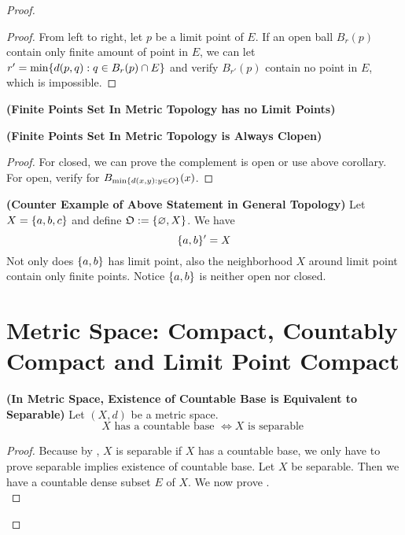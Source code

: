 \documentclass{report}
\begin{document}
\begin{proof}
\begin{proof}
  From left to right, let $p$ be a limit point of  $E$. If an open ball $B_r(p)$ contain only finite amount of point in $E$, we can let $r'=\min \{ d(p,q):q\in B_r(p)\cap E \}$ and verify  $B_{r'}(p)$ contain no point in $E$, which is impossible. 
\end{proof}
\begin{corollary}
\label{1.9.7}
\textbf{(Finite Points Set In Metric Topology has no Limit Points)} 
\end{corollary}
\begin{corollary}
\label{1.9.8}
\textbf{(Finite Points Set In Metric Topology is Always Clopen)} \end{corollary}
\begin{proof}
For closed, we can prove the complement is open or use above corollary. For open, verify for $B_{\min \{ d(x,y):y \in O \}}(x)$. 
\end{proof}
\begin{theorem}
\label{1.9.9}
\textbf{(Counter Example of Above Statement in General Topology)} Let $X=\{ a,b,c \}$ and define $\mathfrak{O}:=\{ \varnothing,X \}$. We have 
\begin{equation}
\{ a,b \}'=X
\end{equation}
Not only does $\{ a,b \}$ has limit point, also the neighborhood $X$ around limit point contain only finite points. Notice $\{ a,b \}$ is neither open nor closed.
\end{theorem}
\section{Metric Space: Compact, Countably Compact and Limit Point Compact}
\begin{theorem}
\label{1.10.1}
\textbf{(In Metric Space, Existence of Countable Base is Equivalent to Separable)} Let $(X,d)$ be a metric space. 
\begin{equation}
X\text{ has a countable base }\iff  X\text{ is separable }
\end{equation}
\end{theorem}
\begin{proof}
Because by , $X$ is separable if  $X$ has a countable base, we only have to prove separable implies existence of countable base. Let $X$ be separable. Then we have a countable dense subset $E$ of $X$. We now prove
.\\


\end{proof}
\end{proof}
\end{document}
